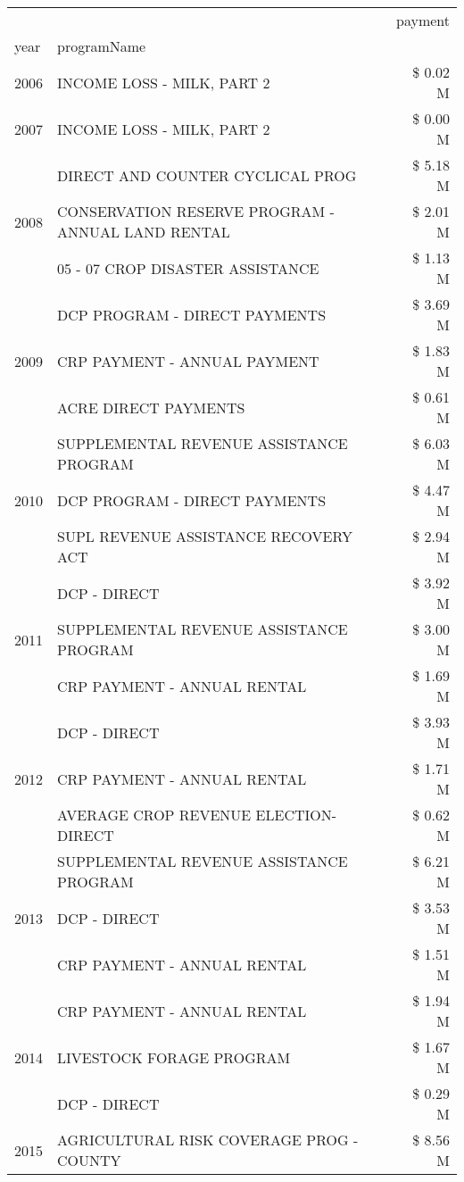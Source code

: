 \begin{tabular}{llr}
\toprule
 &  & payment \\
year & programName &  \\
\midrule
2006 & INCOME LOSS - MILK, PART 2 & \$ 0.02 M \\
\cline{1-3}
2007 & INCOME LOSS - MILK, PART 2 & \$ 0.00 M \\
\cline{1-3}
\multirow[t]{3}{*}{2008} & DIRECT AND COUNTER CYCLICAL PROG & \$ 5.18 M \\
 & CONSERVATION RESERVE PROGRAM - ANNUAL LAND RENTAL & \$ 2.01 M \\
 & 05 - 07 CROP DISASTER ASSISTANCE & \$ 1.13 M \\
\cline{1-3}
\multirow[t]{3}{*}{2009} & DCP PROGRAM - DIRECT PAYMENTS & \$ 3.69 M \\
 & CRP PAYMENT - ANNUAL PAYMENT & \$ 1.83 M \\
 & ACRE DIRECT PAYMENTS & \$ 0.61 M \\
\cline{1-3}
\multirow[t]{3}{*}{2010} & SUPPLEMENTAL REVENUE ASSISTANCE PROGRAM & \$ 6.03 M \\
 & DCP PROGRAM - DIRECT PAYMENTS & \$ 4.47 M \\
 & SUPL REVENUE ASSISTANCE RECOVERY ACT & \$ 2.94 M \\
\cline{1-3}
\multirow[t]{3}{*}{2011} & DCP - DIRECT & \$ 3.92 M \\
 & SUPPLEMENTAL REVENUE ASSISTANCE PROGRAM & \$ 3.00 M \\
 & CRP PAYMENT - ANNUAL RENTAL & \$ 1.69 M \\
\cline{1-3}
\multirow[t]{3}{*}{2012} & DCP - DIRECT & \$ 3.93 M \\
 & CRP PAYMENT - ANNUAL RENTAL & \$ 1.71 M \\
 & AVERAGE CROP REVENUE ELECTION-DIRECT & \$ 0.62 M \\
\cline{1-3}
\multirow[t]{3}{*}{2013} & SUPPLEMENTAL REVENUE ASSISTANCE PROGRAM & \$ 6.21 M \\
 & DCP - DIRECT & \$ 3.53 M \\
 & CRP PAYMENT - ANNUAL RENTAL & \$ 1.51 M \\
\cline{1-3}
\multirow[t]{3}{*}{2014} & CRP PAYMENT - ANNUAL RENTAL & \$ 1.94 M \\
 & LIVESTOCK FORAGE PROGRAM & \$ 1.67 M \\
 & DCP - DIRECT & \$ 0.29 M \\
\cline{1-3}
\multirow[t]{3}{*}{2015} & AGRICULTURAL RISK COVERAGE PROG - COUNTY & \$ 8.56 M \\

\end{tabular}
